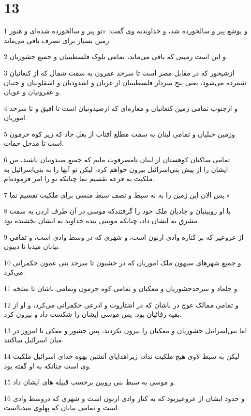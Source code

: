 \chapter{13}

\par 1 و یوشع پیر و سالخورده شد، و خداوندبه وی گفت: «تو پیر و سالخورده شده‌ای و هنوز زمین بسیار برای تصرف باقی می‌ماند.
\par 2 و این است زمینی که باقی می‌ماند، تمامی بلوک فلسطینیان و جمیع جشوریان.
\par 3 ازشیحور که در مقابل مصر است تا سرحد عقرون به سمت شمال که از کنعانیان شمرده می‌شود، یعنی پنج سردار فلسطینیان از غزیان و اشدودیان و اشقلونیان و جتیان و عقرونیان و عویان.
\par 4 و ازجنوب تمامی زمین کنعانیان و مغاره‌ای که ازصیدونیان است تا افیق و تا سرحد اموریان.
\par 5 وزمین جبلیان و تمامی لبنان به سمت مطلع آفتاب از بعل جاد که زیر کوه حرمون است تا مدخل حمات.
\par 6 تمامی ساکنان کوهستان از لبنان تامصرفوت مایم که جمیع صیدونیان باشند، من ایشان را از پیش بنی‌اسرائیل بیرون خواهم کرد، لیکن تو آنها را به بنی‌اسرائیل به ملکیت به قرعه تقسیم نما چنانکه تو را امر فرموده‌ام.
\par 7 پس الان این زمین را به نه سبط و نصف سبط منسی برای ملکیت تقسیم نما.»
\par 8 با او روبینیان و جادیان ملک خود را گرفتندکه موسی در آن طرف اردن به سمت مشرق به ایشان داد، چنانکه موسی بنده خداوند به ایشان بخشیده بود.
\par 9 از عروعیر که بر کناره وادی ارنون است، و شهری که در وسط وادی است، و تمامی بیابان میدبا تا دیبون.
\par 10 و جمیع شهرهای سیهون ملک اموریان که در حشبون تا سرحد بنی عمون حکمرانی می‌کرد.
\par 11 و جلعاد و سرحدجشوریان و معکیان و تمامی کوه حرمون وتمامی باشان تا سلخه.
\par 12 و تمامی ممالک عوج در باشان که در اشتاروت و ادرعی حکمرانی می‌کرد، و او از بقیه رفائیان بود. پس موسی ایشان را شکست داد و بیرون کرد.
\par 13 اما بنی‌اسرائیل جشوریان و معکیان را بیرون نکردند، پس جشور و معکی تا امروز در میان اسرائیل ساکنند.
\par 14 لیکن به سبط لاوی هیچ ملکیت نداد، زیراهدایای آتشین یهوه خدای اسرائیل ملکیت وی است چنانکه به او گفته بود.
\par 15 و موسی به سبط بنی روبین برحسب قبیله های ایشان داد.
\par 16 و حدود ایشان از عروعیربود که به کنار وادی ارنون است و شهری که دروسط وادی است و تمامی بیابان که پهلوی میدبااست.
